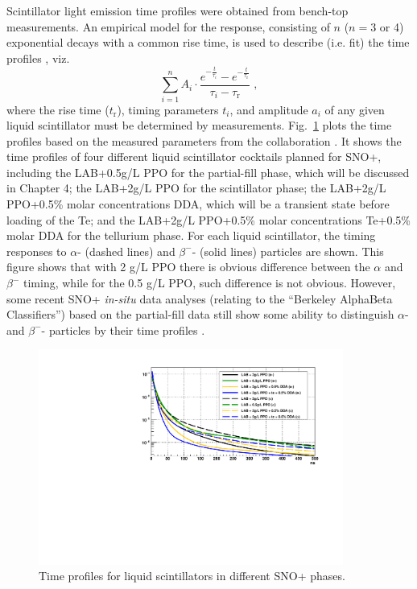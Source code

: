 Scintillator light emission time profiles were obtained from bench-top measurements. An empirical model for the response, consisting of $n$ ($n=3$ or 4) exponential decays with a common rise time, is used to describe (i.e. fit) the time profiles \cite{biller2020slow}, viz.
\begin{equation}
\sum^{n}_{i=1}A_i\cdot\frac{e^{-\frac{t}{\tau_i}}-e^{-\frac{t}{\tau_{\mathrm{r}}}}}{\tau_i-\tau_{\mathrm{r}}}\;,
\end{equation}
where the rise time ($t_{\mathrm{r}}$), timing parameters $t_i$, and amplitude $a_i$ of any given liquid scintillator must be determined by measurements. Fig.~\ref{fig:allTiming} plots the time profiles based on the measured parameters from the collaboration \cite{chicagoTiming,tanner0p5,tannerTeDDA,joshW1}. It shows the time profiles of four different liquid scintillator cocktails planned for SNO+, including the LAB+0.5g/L PPO for the partial-fill phase, which will be discussed in Chapter 4; the LAB+2g/L PPO for the scintillator phase; the LAB+2g/L PPO+0.5\% molar concentrations DDA, which will be a transient state before loading of the Te; and the LAB+2g/L PPO+0.5\% molar concentrations Te+0.5\% molar DDA for the tellurium phase. For each liquid scintillator, the timing responses to $\alpha$- (dashed lines) and $\beta^-$- (solid lines) particles are shown. This figure shows that with 2 g/L PPO there is obvious difference between the $\alpha$ and $\beta^-$ timing, while for the 0.5 g/L PPO, such difference is not obvious. However, some recent SNO+ \emph{in-situ} data analyses (relating to the ``Berkeley AlphaBeta Classifiers'') based on the partial-fill data still show some ability to distinguish $\alpha$- and $\beta^-$- particles by their time profiles \cite{maxSmileyBerkeleyAlphaBeta}. 

\begin{figure}[!htb]
	\centering
	\includegraphics[width=10cm]{plotAllTiming.pdf}
	\caption{Time profiles for liquid scintillators in different SNO+ phases.}
	\label{fig:allTiming}
\end{figure}

